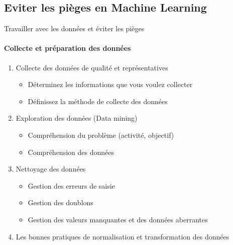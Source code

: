 \documentclass{beamer}
\begin{document}
	\subsection{Eviter les pièges en Machine Learning}
\begin{frame}{Travailler avec les données et éviter les pièges}
	\framesubtitle{Collecte et préparation des données}
	\begin{enumerate}
		\item Collecte des données de qualité et représentatives
			\begin{itemize}
				\item Déterminez les informations que vous voulez collecter
				\item Définissez la méthode de collecte des données
			\end{itemize}
		\item Exploration des données (Data mining)
			\begin{itemize}
				\item Compréhension du problème (activité, objectif)
				\item Compréhension des données
			\end{itemize}
		\item Nettoyage des données 
			\begin{itemize}
				\item Gestion des erreurs de saisie
				\item  Gestion des doublons
				\item  Gestion des valeurs manquantes et des données aberrantes
			\end{itemize}
		\item Les bonnes pratiques de normalisation et transformation des données
	\end{enumerate}
\end{frame}
	
	
\end{document}
